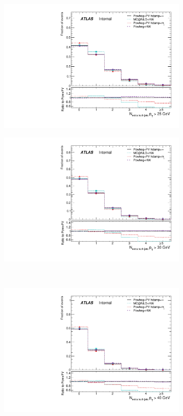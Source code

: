 \begin{figure}
\centering
\begin{subfigure}[]{0.45\textwidth}
\includegraphics[width=\textwidth]{fig/MCComp/NTruthExtraJets25.pdf}
\end{subfigure}
\begin{subfigure}[]{0.45\textwidth}
\includegraphics[width=\textwidth]{fig/MCComp/NTruthExtraJets30.pdf}
\end{subfigure}
\\
\begin{subfigure}[]{0.45\textwidth}
\includegraphics[width=\textwidth]{fig/MCComp/NTruthExtraJets40.pdf}

\end{subfigure}
\end{figure}
